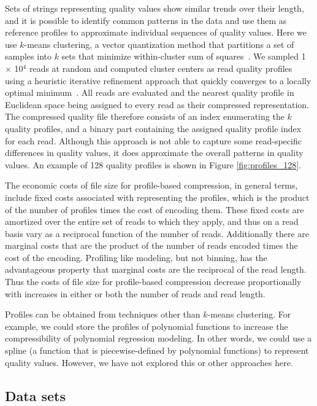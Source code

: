 \documentclass{bmcart}
\begin{document}
Sets of strings representing quality values show similar trends over
their length, and it is possible to identify common patterns in the
data and use them as reference profiles to approximate individual
sequences of quality values. Here we use $k$-means clustering, a
vector quantization method that partitions a set of samples into $k$
sets that minimize within-cluster sum of
squares~\cite{macqueen1967some}. We sampled 1 $\times$ 10$^{4}$ reads
at random and computed cluster centers as read quality profiles using
a heuristic iterative refinement approach that quickly converges to a
locally optimal minimum~\cite{hartigan1979algorithm}. All reads are
evaluated and the nearest quality profile in Euclidean space being
assigned to every read as their compressed representation.  The
compressed quality file therefore consists of an index enumerating the
$k$ quality profiles, and a binary part containing the assigned
quality profile index for each read.  Although this approach is not
able to capture some read-specific differences in quality values, it
does approximate the overall patterns in quality values. An example of
128 quality profiles is shown in Figure \ref{fig:profiles_128}.

The economic costs of file size for profile-based compression, in
general terms, include fixed costs associated with representing the
profiles, which is the product of the number of profiles times the
cost of encoding them. These fixed costs are amortized over the entire
set of reads to which they apply, and thus on a read basis vary as a
reciprocal function of the number of reads. Additionally there are
marginal costs that are the product of the number of reads encoded
times the cost of the encoding. Profiling like modeling, but not
binning, has the advantageous property that marginal costs are the
reciprocal of the read length. Thus the costs of file size for
profile-based compression decrease proportionally with increases in
either or both the number of reads and read length.

Profiles can be obtained from techniques other than $k$-means
clustering. For example, we could store the profiles of polynomial
functions to increase the compressibility of polynomial regression
modeling. In other words, we could use a spline (a function that is
piecewise-defined by polynomial functions) to represent quality
values. However, we have not explored this or other approaches here.

\subsection*{Data sets}
\end{document}
